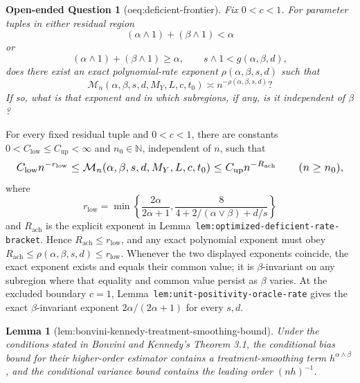 \documentclass{article}
\newtheorem{lemma}{Lemma}
\newtheorem{openendedquestion}{Open-ended Question}
\begin{document}
\begin{openendedquestion}[oeq:deficient-frontier]\label{oeq:deficient-frontier}
Fix \(0<c<1\). For parameter tuples in either residual region
\[
(\alpha\wedge1)+(\beta\wedge1)<\alpha
\]
or
\[
(\alpha\wedge1)+(\beta\wedge1)\ge\alpha,
\qquad s\wedge1<g(\alpha,\beta,d),
\]
does there exist an exact polynomial-rate exponent \(\rho(\alpha,\beta,s,d)\) such that
\[
\mathcal M_n(\alpha,\beta,s,d,M_Y,L,c,t_0)
\asymp n^{-\rho(\alpha,\beta,s,d)}?
\]
If so, what is that exponent and in which subregions, if any, is it independent of \(\beta\)?
\end{openendedquestion}
For every fixed residual tuple and \(0<c<1\), there are constants \(0<C_{\mathrm{low}}\le C_{\mathrm{up}}<\infty\) and \(n_0\in\mathbb N\), independent of \(n\), such that
\[
\makebox[\linewidth][c]{\resizebox{0.98\linewidth}{!}{\(\displaystyle C_{\mathrm{low}}n^{-r_{\mathrm{low}}}
\le
\mathcal M_n(\alpha,\beta,s,d,M_Y,L,c,t_0)
\le
C_{\mathrm{up}}n^{-R_{\mathrm{ach}}}
\qquad(n\ge n_0),\)}}
\]
where
\[
r_{\mathrm{low}}
=
\min\left\{
\frac{2\alpha}{2\alpha+1},
\frac{8}{4+2/(\alpha\vee\beta)+d/s}
\right\}
\]
and \(R_{\mathrm{ach}}\) is the explicit exponent in Lemma~\texttt{lem:optimized-deficient-rate-bracket}. Hence \(R_{\mathrm{ach}}\le r_{\mathrm{low}}\), and any exact polynomial exponent must obey \(R_{\mathrm{ach}}\le\rho(\alpha,\beta,s,d)\le r_{\mathrm{low}}\). Whenever the two displayed exponents coincide, the exact exponent exists and equals their common value; it is \(\beta\)-invariant on any subregion where that equality and common value persist as \(\beta\) varies. At the excluded boundary \(c=1\), Lemma~\texttt{lem:unit-positivity-oracle-rate} gives the exact \(\beta\)-invariant exponent \(2\alpha/(2\alpha+1)\) for every \(s,d\).

\begin{lemma}[lem:bonvini-kennedy-treatment-smoothing-bound]\label{lem:bonvini-kennedy-treatment-smoothing-bound}
Under the conditions stated in Bonvini and Kennedy's Theorem 3.1, the conditional bias bound for their higher-order estimator contains a treatment-smoothing term \(h^{\alpha\wedge\beta}\), and the conditional variance bound contains the leading order \((nh)^{-1}\).
\end{lemma}
\end{document}
